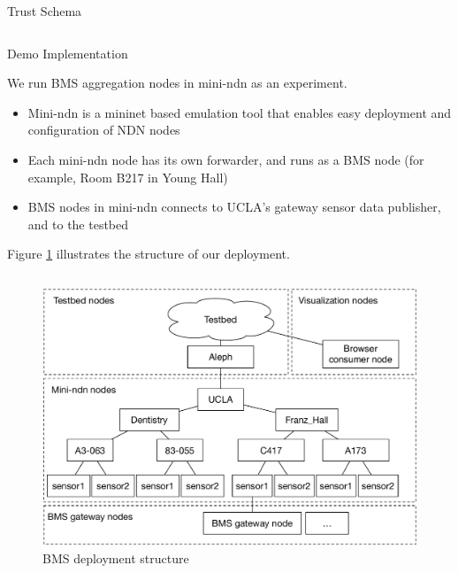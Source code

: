 \documentclass[final,hyperref={pdfpagelabels=false},16pt]{beamer}
\begin{document}
\begin{frame}[t]
\begin{columns}[t]
\begin{column}{.465\textwidth}
\begin{block}{Trust Schema}
\begin{columns}[T]
\end{columns}

\end{block}


\begin{block}{Demo Implementation}

We run BMS aggregation nodes in mini-ndn as an experiment.

\begin{itemize}
\item{Mini-ndn is a mininet based emulation tool that enables easy deployment and configuration of NDN nodes \cite{minindn-github}}
\item{Each mini-ndn node has its own forwarder, and runs as a BMS node (for example, Room B217 in Young Hall)}
\item{BMS nodes in mini-ndn connects to UCLA's gateway sensor data publisher, and to the testbed}
\end{itemize}

Figure \ref{fig:node-structure} illustrates the structure of our deployment.

\begin{columns}[T]

\begin{column}{.47\textwidth}
\begin{figure}
\includegraphics[width=\linewidth]{bms-nodes-structure}
\caption{BMS deployment structure}
\label{fig:node-structure}
\end{figure}
\end{column}


\end{columns}
\end{block}
\end{column}
\end{columns}
\end{frame}
\end{document}
